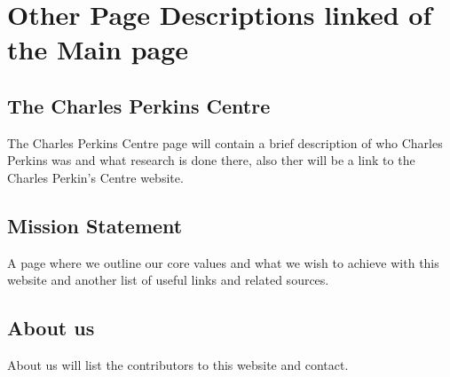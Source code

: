 \documentclass[letterpaper,12pt]{article}
\begin{document}
\section{Other Page Descriptions linked of the Main page}
\subsection{The Charles Perkins Centre}

The Charles Perkins Centre page will contain a brief description of who Charles Perkins was and what research is done there, also ther will be a link to the Charles Perkin's Centre website.

\subsection{Mission Statement} 

A page where we outline our core values and what we wish to achieve with this website and another list of useful links and related sources.


\subsection{About us}

About us will list the contributors to this website and contact.


\end{document}
